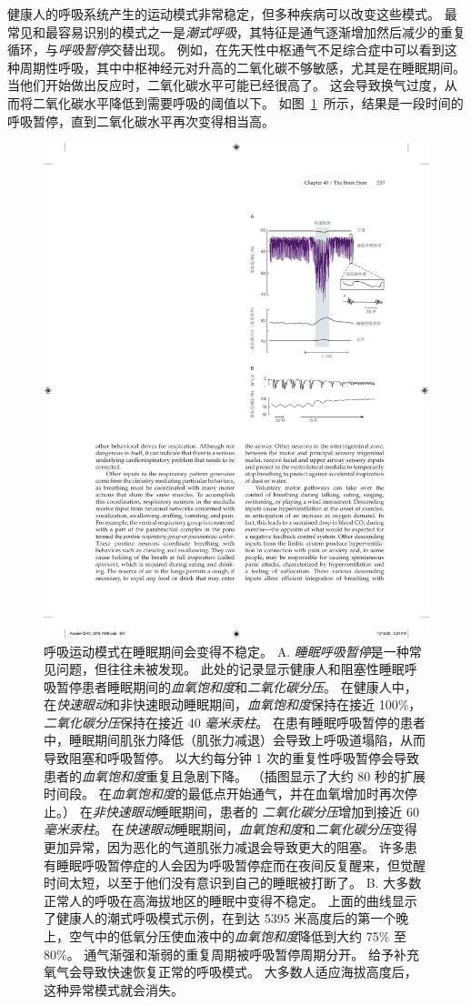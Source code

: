 健康人的呼吸系统产生的运动模式非常稳定，但多种疾病可以改变这些模式。
最常见和最容易识别的模式之一是\textit{潮式呼吸}，其特征是通气逐渐增加然后减少的重复循环，与\textit{呼吸暂停}交替出现。
例如，在先天性中枢通气不足综合症中可以看到这种周期性呼吸，其中中枢神经元对升高的二氧化碳不够敏感，尤其是在睡眠期间。
当他们开始做出反应时，二氧化碳水平可能已经很高了。
这会导致换气过度，从而将二氧化碳水平降低到需要呼吸的阈值以下。
如图~\ref{fig:40_10}~所示，结果是一段时间的呼吸暂停，直到二氧化碳水平再次变得相当高。


\begin{figure}[htbp]
	\centering
	\includegraphics[width=0.72\linewidth]{chap40/fig_40_10}
	\caption{呼吸运动模式在睡眠期间会变得不稳定。
		A. \textit{睡眠呼吸暂停}是一种常见问题，但往往未被发现。
		此处的记录显示健康人和阻塞性睡眠呼吸暂停患者睡眠期间的\textit{血氧饱和度}和\textit{二氧化碳分压}。
		在健康人中，在\textit{快速眼动}和非快速眼动睡眠期间，\textit{血氧饱和度}保持在接近 100\%，\textit{二氧化碳分压}保持在接近 40 \textit{毫米汞柱}。
		在患有睡眠呼吸暂停的患者中，睡眠期间肌张力降低（肌张力减退）会导致上呼吸道塌陷，从而导致阻塞和呼吸暂停。
		以大约每分钟 1 次的重复性呼吸暂停会导致患者的\textit{血氧饱和度}重复且急剧下降。
		（插图显示了大约 80 秒的扩展时间段。
		在\textit{血氧饱和度}的最低点开始通气，并在血氧增加时再次停止。）
		在\textit{非快速眼动}睡眠期间，患者的 \textit{二氧化碳分压}增加到接近 60 \textit{毫米汞柱}。 
		在\textit{快速眼动}睡眠期间，\textit{血氧饱和度}和\textit{二氧化碳分压}变得更加异常，因为恶化的气道肌张力减退会导致更大的阻塞。
		许多患有睡眠呼吸暂停症的人会因为呼吸暂停症而在夜间反复醒来，但觉醒时间太短，以至于他们没有意识到自己的睡眠被打断了\cite{grunstein1990neural}。 
		B. 大多数正常人的呼吸在高海拔地区的睡眠中变得不稳定。
		上面的曲线显示了健康人的潮式呼吸模式示例，在到达 5395 米高度后的第一个晚上，空气中的低氧分压使血液中的\textit{血氧饱和度}降低到大约 75\% 至 80\%。
		通气渐强和渐弱的重复周期被呼吸暂停周期分开。
		给予补充氧气会导致快速恢复正常的呼吸模式。
		大多数人适应海拔高度后，这种异常模式就会消失\cite{lahiri1984sleep}。}
	\label{fig:40_10}
\end{figure}


